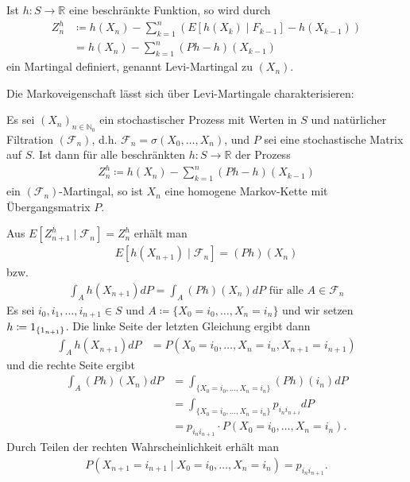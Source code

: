 \documentclass[a4paper,twoside,DIV15,BCOR12mm]{scrbook}
\newcommand{\cF}{\mathcal F}
\begin{document}
\begin{bemerkung}
Ist $h:S\to \mathbb R$ eine beschränkte Funktion, so wird durch
\begin{align*}
Z_n^h &\coloneqq h(X_n) - \sum_{k=1}^n (E[h(X_k)\mid F_{k-1}] - h(X_{k-1})) \\
&= h(X_n) - \sum_{k=1}^n (Ph-h)(X_{k-1})
\end{align*}
ein Martingal definiert, genannt Levi-Martingal zu $(X_n)$.
\end{bemerkung}

Die Markoveigenschaft lässt sich über Levi-Martingale charakterisieren:

\begin{satz}
Es sei $(X_n)_{n\in\mathbb N_0}$ ein stochastischer Prozess mit Werten in $S$ und natürlicher Filtration $(\cF_n)$, d.h. $\cF_n=\sigma(X_0,\ldots,X_n)$, und $P$ sei eine stochastische Matrix auf $S$. Ist dann für alle beschränkten $h:S\to \mathbb R$ der Prozess
\begin{align*}
Z_n^h\coloneqq h(X_n) - \sum_{k=1}^n (Ph-h)(X_{k-1})
\end{align*}
ein $(\cF_n)$-Martingal, so ist $X_n$ eine homogene Markov-Kette mit Übergangsmatrix $P$.
\end{satz}

\begin{beweis}
Aus $E[Z_{n+1}^h\mid \cF_n] = Z_n^h$ erhält man 
\begin{align*}
E[h(X_{n+1})\mid \cF_n] = (Ph)(X_n)
\end{align*}
bzw. 
\begin{align*}
\int_A h(X_{n+1})dP = \int_A (Ph)(X_n)dP \text{ für alle }A\in \cF_n
\end{align*}
Es sei $i_0,i_1,\ldots,i_{n+1}\in S$ und $A\coloneqq \{X_0 = i_0,\ldots,X_n=i_n\}$ und wir setzen $h\da 1_{\{1_{n+1}\}}$. Die linke Seite der letzten Gleichung ergibt dann 
\begin{align*}
\int_A h(X_{n+1})dP &= P(X_0=i_0,\ldots,X_n=i_n,X_{n+1}=i_{n+1})
\end{align*}
und die rechte Seite ergibt
\begin{align*}
\int_A (Ph)(X_n)dP &= \int_{\{X_0=i_0,\ldots,X_n=i_n\}} (Ph)(i_n)dP \\
&= \int_{\{X_0=i_0,\ldots,X_n=i_n\}} p_{i_ni_{n+i}}dP \\
&= p_{i_ni_{n+1}} \cdot P(X_0=i_0,\ldots,X_n=i_n).
\end{align*}
Durch Teilen der rechten Wahrscheinlichkeit erhält man
\begin{align*}
P(X_{n+1}=i_{n+1} \mid X_0=i_0,\ldots,X_n=i_n) = p_{i_ni_{n+1}}.
\end{align*}
\end{beweis}
\end{document}
